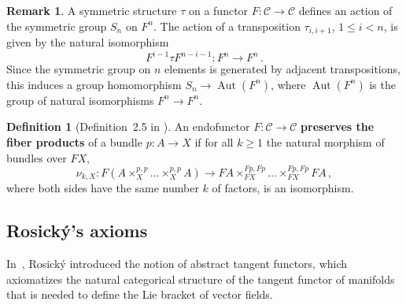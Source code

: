 \documentclass[12pt,reqno, a4paper]{amsart}
\numberwithin{equation}{section}
\theoremstyle{plain}
\theoremstyle{definition}
\newtheorem{Remark}[Theorem]{Remark}
\newtheorem{Definition}[Theorem]{Definition}
\theoremstyle{remark}
\DeclareMathOperator{\Aut}{Aut}
\newcommand{\calC}{\mathcal{C}}
\newcommand{\Id}{\mathrm{1}}
\begin{document}
\begin{Remark}
A symmetric structure $\tau$ on a functor $F:\calC \to \calC$ defines an action of the symmetric group $S_n$ on $F^n$. The action of a transposition $\tau_{i,i+1}$, $1 \leq i < n$, is given by the natural isomorphism
\begin{equation*}
  F^{i-1} \tau F^{n-i-1}: F^n \longrightarrow F^n \,.
\end{equation*}
Since the symmetric group on $n$ elements is generated by adjacent transpositions, this induces a group homomorphism $S_n \to \Aut(F^n)$, where $\Aut(F^n)$ is the group of natural isomorphisms $F^n \to F^n$.
\end{Remark}

\begin{Definition}[Definition~2.5 in \cite{AintablianBlohmann:2026}]
\label{def:PreserveFibProd}
An endofunctor $F: \calC \to \calC$ \textbf{preserves the fiber products} of a bundle $p:A \to X$ if for all $k \geq 1$ the natural morphism of bundles over $FX$,
\begin{equation}
\label{eq:MorphBundles4}
  \nu_{k,X}:
  F(A \times_X^{p,p} \ldots \times_X^{p,p} A) \longrightarrow
  FA \times_{FX}^{Fp, Fp} \ldots \times_{FX}^{Fp, Fp} FA
  \,,
\end{equation}
where both sides have the same number $k$ of factors, is an isomorphism.
\end{Definition}



\subsection{Rosick\'{y}'s axioms}
\label{sec:RosickysAxioms}

In~\cite{Rosicky:1984}, Rosick\'{y} introduced the notion of abstract tangent functors, which axiomatizes the natural categorical structure of the tangent functor of manifolds that is needed to define the Lie bracket of vector fields.
\end{document}
